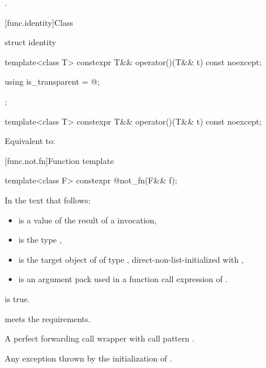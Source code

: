 \begin{itemdescr}
\pnum
\returns
{}.
\end{itemdescr}


[func.identity]{Class }

%
\begin{itemdecl}
struct identity {
  template<class T>
    constexpr T&& operator()(T&& t) const noexcept;

  using is_transparent = @\unspec@;
};

template<class T>
  constexpr T&& operator()(T&& t) const noexcept;
\end{itemdecl}

\begin{itemdescr}
\pnum
\effects
Equivalent to: 
\end{itemdescr}


[func.not.fn]{Function template }

%
\begin{itemdecl}
template<class F> constexpr @\unspec@ not_fn(F&& f);
\end{itemdecl}

\begin{itemdescr}
\pnum
In the text that follows:
\begin{itemize}
\item {} is a value of the result of a  invocation,
\item {} is the type ,
\item {} is the target object of 
  of type ,
  direct-non-list-initialized with ,
\item {} is an argument pack
  used in a function call expression of .
\end{itemize}

\pnum
\mandates
{}
is true.

\pnum
\expects
{} meets the  requirements.

\pnum
\returns
A perfect forwarding call wrapper 
with call pattern .

\pnum
\throws
Any exception thrown by the initialization of .
\end{itemdescr}

